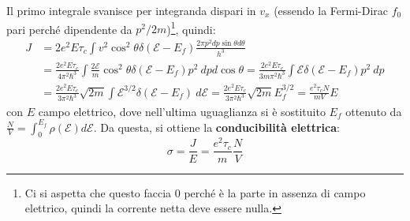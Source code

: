 \documentclass[10pt, a4paper]{scrartcl}
\numberwithin{equation}{subsection}
\theoremstyle{style1}
\begin{document}
Il primo integrale svanisce per integranda dispari in $v_x$ (essendo la Fermi-Dirac $f_0$ pari perch\'e dipendente da $p^2 / 2m$)\footnote{Ci si aspetta che questo faccia $0$ perch\'e \`e la parte in assenza di campo elettrico, quindi la corrente netta deve essere nulla.}, quindi:
\begin{equation}
	\begin{split}
		J &= 2e^2 E \tau _c \int v^2 \cos^2 \theta  \delta (\mathscr{E} -E_f) \frac{2\pi p ^2 dp \sin \theta  d\theta }{h^3}\\
		  & = \frac{2e^2 E \tau _c }{4\pi^2 \hbar ^3} \int \frac{2\mathscr{E}}{m} \cos^2 \theta \delta (\mathscr{E}-E_f) p^2 \ dp d\cos \theta = \frac{2e^2 E \tau _c}{3 m \pi^2 \hbar ^3} \int \mathscr{E} \delta (\mathscr{E} - E_f) p^2 \ dp\\
		  &= \frac{2 e^2 E \tau _c}{3 \pi ^2 \hbar ^3} \sqrt{ 2m}  \int \mathscr{E }^{3 / 2}  \delta (\mathscr{E}-E_f) \ d\mathscr{E} = \frac{2e^2 E \tau _c}{3 \pi^2 \hbar ^3} \sqrt{2m}  E_f ^{3 / 2} = \frac{e^2 \tau _c N}{mV } E
	\end{split}
\end{equation}
con $E $ campo elettrico, dove nell'ultima uguaglianza si \`e sostituito $E_f$ ottenuto da $\frac{N}{V}=\int_{0} ^{E_f} \rho (\mathscr{E}) d  \mathscr{E}$. Da questa, si ottiene la \textbf{conducibilit\`a elettrica}:
\begin{equation}
	\sigma  = \frac{J}{E} = \frac{e^2 \tau _c}{m} \frac{N}{V}
\end{equation}
\end{document}
